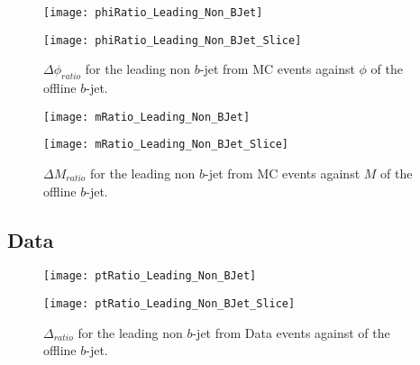 		\begin{figure}[h]
			\centering

			\begin{minipage}[h]{0.33\linewidth}
				\texttt{[image: phiRatio\_Leading\_Non\_BJet]}
			\end{minipage}
			\quad
			\begin{minipage}[h]{0.33\linewidth}
				\texttt{[image: phiRatio\_Leading\_Non\_BJet\_Slice]}
			\end{minipage}
			\caption{$\Delta \phi_{ratio}$ for the leading \pt non $b$-jet from MC events against $\phi$ of the offline $b$-jet. }
			\label{fig:MC:nonleadingbphi}
		\end{figure}

		\begin{figure}[h]
			\centering

			\begin{minipage}[h]{0.33\linewidth}
				\texttt{[image: mRatio\_Leading\_Non\_BJet]}
			\end{minipage}
			\quad
			\begin{minipage}[h]{0.33\linewidth}
				\texttt{[image: mRatio\_Leading\_Non\_BJet\_Slice]}
			\end{minipage}
			\caption{$\Delta M_{ratio}$ for the leading \pt non $b$-jet from MC events against $M$ of the offline $b$-jet. }
			\label{fig:MC:nonleadingbm}
		\end{figure}

	\newpage
	\subsection{Data}
	
	

		\begin{figure}[h]
			\centering
			\begin{minipage}[h]{0.33\linewidth}
				\texttt{[image: ptRatio\_Leading\_Non\_BJet]}
				
			\end{minipage}
			\quad
			\begin{minipage}[h]{0.33\linewidth}
				\texttt{[image: ptRatio\_Leading\_Non\_BJet\_Slice]}
			\end{minipage}
			\caption{$\Delta $\pt$_{ratio}$ for the leading \pt non $b$-jet from Data events against \pt of the offline $b$-jet. }
			\label{fig:D:nonleadingbpt}
		\end{figure}
		
